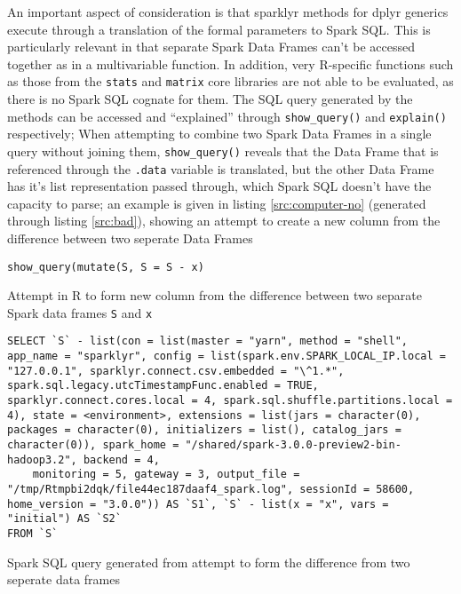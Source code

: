 \documentclass[10pt,a4paper]{article}
\begin{document}
An important aspect of consideration is that sparklyr methods for dplyr
generics execute through a translation of the formal parameters to Spark SQL.
This is particularly relevant in that separate Spark Data Frames can't be
accessed together as in a multivariable function.
In addition, very R-specific functions such as those from the \texttt{stats}
and \texttt{matrix} core libraries are not able to be evaluated, as there is no
Spark SQL cognate for them.
The SQL query generated by the methods can be accessed and ``explained''
through \texttt{show\_query()} and \texttt{explain()} respectively;
When attempting to combine two Spark Data Frames in a single query without 
joining them, \texttt{show\_query()} reveals that the Data Frame that is
referenced through the \texttt{.data} variable is translated, but the other
Data Frame has it's list representation passed through, which Spark SQL doesn't
have the capacity to parse; 
an example is given in listing \ref{src:computer-no} (generated through listing
\ref{src:bad}), showing an attempt to create a new column from the difference
between two seperate Data Frames

\begin{listing}
\begin{verbatim}
show_query(mutate(S, S = S - x)
\end{verbatim}
\caption{Attempt in R to form new column from the difference between two separate Spark data frames \texttt{S} and \texttt{x}}\label{src:bad}
\end{listing}

\begin{listing}
\begin{verbatim}
SELECT `S` - list(con = list(master = "yarn", method = "shell", app_name = "sparklyr", config = list(spark.env.SPARK_LOCAL_IP.local = "127.0.0.1", sparklyr.connect.csv.embedded = "\^1.*", spark.sql.legacy.utcTimestampFunc.enabled = TRUE, sparklyr.connect.cores.local = 4, spark.sql.shuffle.partitions.local = 4), state = <environment>, extensions = list(jars = character(0), packages = character(0), initializers = list(), catalog_jars = character(0)), spark_home = "/shared/spark-3.0.0-preview2-bin-hadoop3.2", backend = 4,
    monitoring = 5, gateway = 3, output_file = "/tmp/Rtmpbi2dqk/file44ec187daaf4_spark.log", sessionId = 58600, home_version = "3.0.0")) AS `S1`, `S` - list(x = "x", vars = "initial") AS `S2`
FROM `S`
\end{verbatim}
\caption{Spark SQL query generated from attempt to form the difference from two seperate data frames}\label{src:computer-no}
\end{listing}
\end{document}
